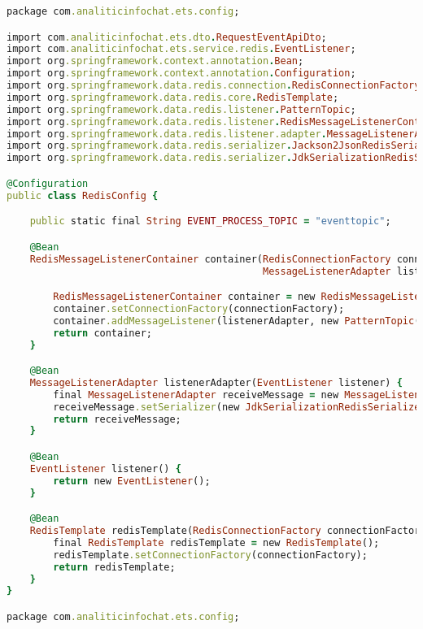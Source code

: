\begin{lstlisting}[language=Ruby, style=rubystyle]
package com.analiticinfochat.ets.config;

import com.analiticinfochat.ets.dto.RequestEventApiDto;
import com.analiticinfochat.ets.service.redis.EventListener;
import org.springframework.context.annotation.Bean;
import org.springframework.context.annotation.Configuration;
import org.springframework.data.redis.connection.RedisConnectionFactory;
import org.springframework.data.redis.core.RedisTemplate;
import org.springframework.data.redis.listener.PatternTopic;
import org.springframework.data.redis.listener.RedisMessageListenerContainer;
import org.springframework.data.redis.listener.adapter.MessageListenerAdapter;
import org.springframework.data.redis.serializer.Jackson2JsonRedisSerializer;
import org.springframework.data.redis.serializer.JdkSerializationRedisSerializer;

@Configuration
public class RedisConfig {

    public static final String EVENT_PROCESS_TOPIC = "eventtopic";

    @Bean
    RedisMessageListenerContainer container(RedisConnectionFactory connectionFactory,
                                            MessageListenerAdapter listenerAdapter) {

        RedisMessageListenerContainer container = new RedisMessageListenerContainer();
        container.setConnectionFactory(connectionFactory);
        container.addMessageListener(listenerAdapter, new PatternTopic(EVENT_PROCESS_TOPIC));
        return container;
    }

    @Bean
    MessageListenerAdapter listenerAdapter(EventListener listener) {
        final MessageListenerAdapter receiveMessage = new MessageListenerAdapter(listener, "processEvent");
        receiveMessage.setSerializer(new JdkSerializationRedisSerializer());
        return receiveMessage;
    }

    @Bean
    EventListener listener() {
        return new EventListener();
    }

    @Bean
    RedisTemplate redisTemplate(RedisConnectionFactory connectionFactory) {
        final RedisTemplate redisTemplate = new RedisTemplate();
        redisTemplate.setConnectionFactory(connectionFactory);
        return redisTemplate;
    }
}

package com.analiticinfochat.ets.config;


\end{lstlisting}
